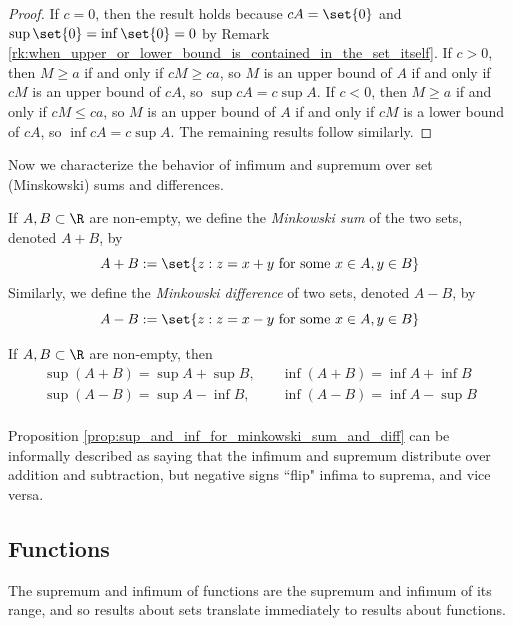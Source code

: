 \documentclass{article} %
\begin{document}
\begin{proof}
If $c=0$, then the result holds because $cA = \set{0}$ and $\sup \set{0} = \inf \set{0} = 0$ by Remark \ref{rk:when_upper_or_lower_bound_is_contained_in_the_set_itself}.	If $c >0$, then $M \geq a$ if and only if $cM \geq ca$, so $M$ is an upper bound of $A$ if and only if $cM$ is an upper bound of $cA$, so $\sup cA = c \sup A$.   If $c<0$, then $M \geq a$ if and only if $cM \leq ca$, so $M$ is an upper bound of $A$ if and only if $cM$ is a lower bound of $cA$, so $\inf cA = c \sup A$.  The remaining results follow similarly. 
\end{proof}


Now we characterize the behavior of infimum and supremum over set (Minskowski) sums and differences.

\begin{definition}
If $A, B \subset \R$ are non-empty, we define the \textit{Minkowski sum} of the two sets, denoted $A+B$, by 
\[ A + B := \set{z : z = x + y \text{ for some } x \in A, y \in B } \]
Similarly, we define the \textit{Minkowski difference} of two sets, denoted $A-B$, by
\[ A - B := \set{z : z = x - y \text{ for some } x \in A, y \in B } \]
\label{def:minkowski_sum_and_difference}	
\end{definition}

\begin{proposition}
If $A, B \subset \R$ are non-empty, then 
\begin{align*}
\sup (A+B) = \sup A + \sup B, &\quad \inf (A+B) = \inf A + \inf B 	 \\
\sup (A-B) = \sup A - \inf B, &\quad \inf (A-B) = \inf A - \sup B 	 \\
\end{align*}

\label{prop:sup_and_inf_for_minkowski_sum_and_diff}	
\end{proposition}

\begin{remark}
Proposition \ref{prop:sup_and_inf_for_minkowski_sum_and_diff} can be informally described as saying that the infimum and supremum distribute over addition and subtraction, but negative signs ``flip" infima to suprema, and vice versa. 
\end{remark}

\subsection{Functions}

The supremum and infimum of functions are the supremum and infimum of its range, and so results about sets translate immediately to results about functions.
\end{document}
